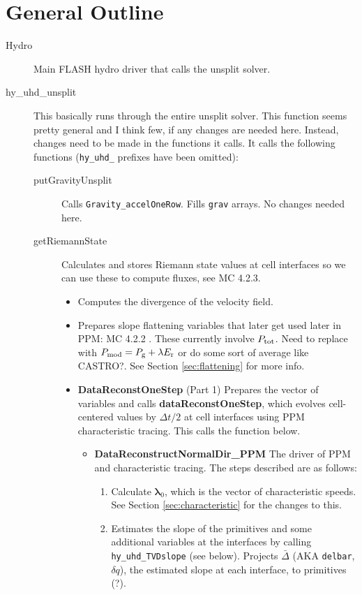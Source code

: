 \documentclass[preprint,11pt]{aastex}
\begin{document}
\section{General Outline}
\label{sec:flowchart}
\begin{description}
	\item[Hydro] Main FLASH hydro driver that calls the unsplit solver.
	\item[hy\_uhd\_unsplit] This basically runs through the entire unsplit solver.  {\color{blue}This function seems pretty general and I think few, if any changes are needed here.  Instead, changes need to be made in the functions it calls.}  It calls the following functions (\verb!hy_uhd_! prefixes have been omitted):
	\begin{description}
		\item[putGravityUnsplit] Calls \verb!Gravity_accelOneRow!.  Fills \verb!grav! arrays.  {\color{blue}No changes needed here}.
		\item[getRiemannState]  Calculates and stores Riemann state values at cell interfaces so we can use these to compute fluxes, see MC 4.2.3.
		\begin{itemize}
			\item Computes the divergence of the velocity field.
			\item Prepares slope flattening variables that later get used later in PPM: MC 4.2.2 . {\color{red} These currently involve $P_{\rm tot}$.} {\color{blue} Need to replace with $P_{\rm mod} = P_{\rm g} + \lambda E_{\rm r}$ or do some sort of average like CASTRO?}.  See Section \ref{sec:flattening} for more info.
			\item \textbf{DataReconstOneStep} (Part 1) Prepares the vector of variables and calls \textbf{dataReconstOneStep}, which evolves cell-centered values by $\Delta t / 2$ at cell interfaces using PPM characteristic tracing.  This calls the function below.
			\begin{itemize}
				\item \textbf{DataReconstructNormalDir\_PPM} The driver of PPM and characteristic tracing.  The steps described are as follows:
				\begin{enumerate}
					\item Calculate $\boldsymbol{\lambda}_0$, which is the vector of characteristic speeds. {\color{red} See Section \ref{sec:characteristic} for the changes to this.}
					\item Estimates the slope of the primitives and some additional variables at the interfaces by calling \verb!hy_uhd_TVDslope! (see below).  Projects $\bar{\Delta}$ (AKA \verb!delbar!, $\delta q$), the estimated slope at each interface, to primitives (?).%

\end{enumerate}
\end{itemize}
\end{itemize}
\end{description}
\end{description}
\end{document}
